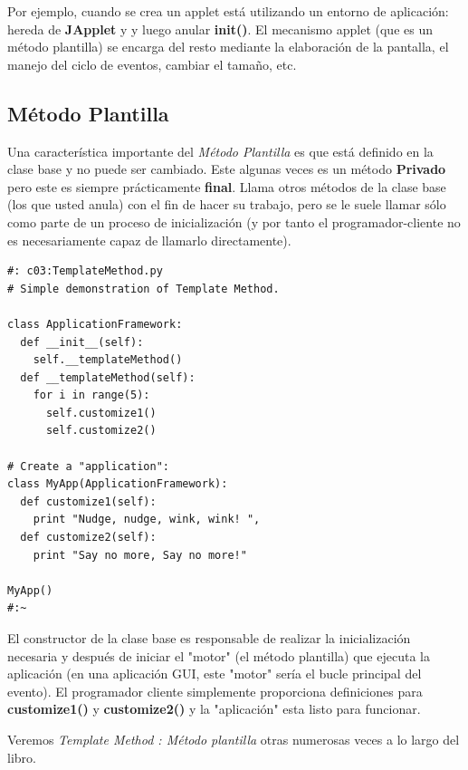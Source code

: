 \documentclass{article}
\begin{document}
Por ejemplo, cuando se crea un applet está utilizando un entorno de aplicación: hereda de \textbf{JApplet} y y luego anular \textbf{init()}. El mecanismo applet (que es un método plantilla) se encarga del resto mediante la elaboración de la pantalla, el manejo del ciclo de eventos, cambiar el tamaño, etc.
        
\subsection{Método Plantilla}

Una característica importante del \textit{Método Plantilla} es que está definido en la clase base y no puede ser cambiado. Este algunas veces es un método \textbf{Privado} pero este es siempre prácticamente \textbf{final}. Llama otros métodos de la clase base (los que usted anula) con el fin de hacer su trabajo, pero se le suele llamar sólo como parte de un proceso de inicialización (y por tanto el programador-cliente no es necesariamente capaz de llamarlo directamente).    \newline

 \begin{lstlisting}
#: c03:TemplateMethod.py 
# Simple demonstration of Template Method. 

class ApplicationFramework: 
  def __init__(self): 
    self.__templateMethod() 
  def __templateMethod(self): 
    for i in range(5): 
      self.customize1() 
      self.customize2() 
      
# Create a "application": 
class MyApp(ApplicationFramework): 
  def customize1(self): 
    print "Nudge, nudge, wink, wink! ", 
  def customize2(self):  
    print "Say no more, Say no more!" 
    
MyApp() 
#:~ 
\end{lstlisting}

El constructor de la clase base es responsable de realizar la inicialización necesaria y después de iniciar el "motor" (el método plantilla) que ejecuta la aplicación (en una aplicación GUI, este "motor" sería el
bucle principal del evento). El programador cliente simplemente proporciona definiciones para \textbf{customize1()}  y \textbf{customize2()} y la "aplicación" esta listo para funcionar.     \newline

Veremos \textit{Template Method : Método plantilla} otras numerosas veces a lo largo del libro.
\end{document}
